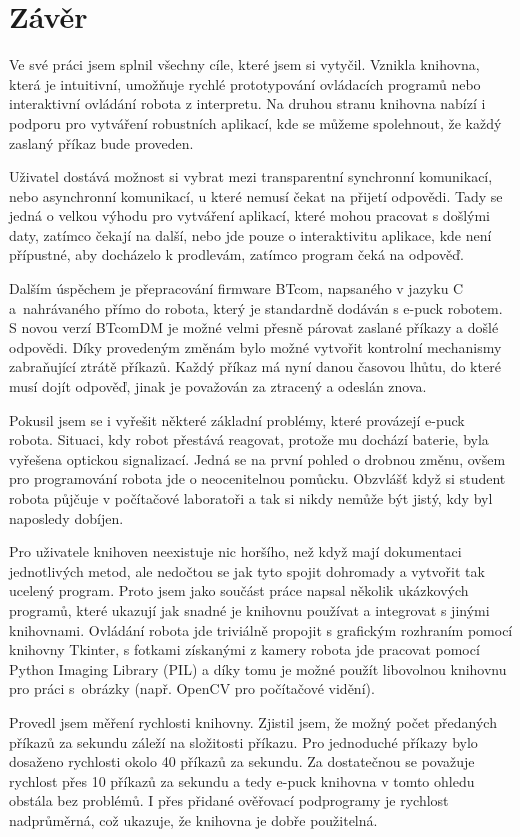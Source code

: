\chapter*{Závěr}

    Ve své práci jsem splnil všechny cíle, které jsem si vytyčil. Vznikla
    knihovna, která je intuitivní, umožňuje rychlé prototypování ovládacích
    programů nebo interaktivní ovládání robota z interpretu. Na druhou stranu
    knihovna nabízí i podporu pro vytváření robustních aplikací, kde se můžeme
    spolehnout, že každý zaslaný příkaz bude proveden.

    Uživatel dostává možnost si vybrat mezi transparentní synchronní
    komunikací, nebo asynchronní komunikací, u které nemusí čekat na přijetí
    odpovědi. Tady se jedná o velkou výhodu pro vytváření aplikací, které mohou
    pracovat s došlými daty, zatímco čekají na další, nebo jde pouze o
    interaktivitu aplikace, kde není přípustné, aby docházelo k prodlevám,
    zatímco program čeká na odpověď.

    Dalším úspěchem je přepracování firmware BTcom, napsaného v jazyku C
    a~nahrávaného přímo do robota, který je standardně dodáván s e-puck
    robotem. S novou verzí BTcomDM je možné velmi přesně párovat zaslané
    příkazy a došlé odpovědi. Díky provedeným změnám bylo možné vytvořit
    kontrolní mechanismy zabraňující ztrátě příkazů. Každý příkaz má nyní danou
    časovou lhůtu, do které musí dojít odpověď, jinak je považován za ztracený
    a odeslán znova.

    Pokusil jsem se i vyřešit některé základní problémy, které provázejí e-puck
    robota. Situaci, kdy robot přestává reagovat, protože mu dochází baterie,
    byla vyřešena optickou signalizací. Jedná se na první pohled o drobnou
    změnu, ovšem pro programování robota jde o neocenitelnou pomůcku. Obzvlášť
    když si student robota půjčuje v počítačové laboratoři a tak si nikdy
    nemůže být jistý, kdy byl naposledy dobíjen.

    Pro uživatele knihoven neexistuje nic horšího, než když mají dokumentaci
    jednotlivých metod, ale nedočtou se jak tyto spojit dohromady a vytvořit
    tak ucelený program. Proto jsem jako součást práce napsal několik
    ukázkových programů, které ukazují jak snadné je knihovnu používat a
    integrovat s jinými knihovnami. Ovládání robota jde triviálně propojit s
    grafickým rozhraním pomocí knihovny Tkinter, s fotkami získanými z kamery
    robota jde pracovat pomocí Python Imaging Library (PIL) a díky tomu je
    možné použít libovolnou knihovnu pro práci s~obrázky (např. OpenCV pro
    počítačové vidění).

    Provedl jsem měření rychlosti knihovny. Zjistil jsem, že možný
    počet předaných příkazů za sekundu záleží na složitosti příkazu.
    Pro jednoduché příkazy bylo dosaženo rychlosti okolo 40 příkazů za sekundu.
    Za dostatečnou se považuje rychlost přes 10 příkazů za sekundu a tedy
    e-puck knihovna v tomto ohledu obstála bez problémů. I přes přidané
    ověřovací podprogramy je rychlost nadprůměrná, což ukazuje, že knihovna je
    dobře použitelná.
